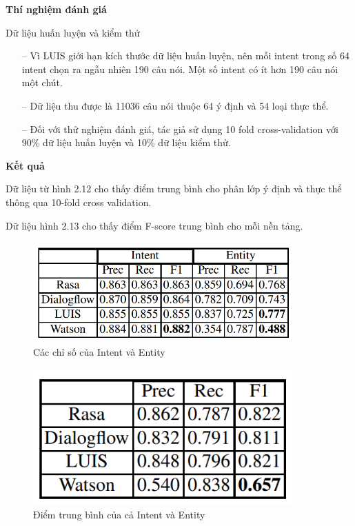 \textbf{Thí nghiệm đánh giá}

Dữ liệu huấn luyện và kiểm thử
\begin{itemize}
    \item[--] Vì LUIS giới hạn kích thước dữ liệu huấn luyện, nên mỗi intent trong số 64 intent chọn ra ngẫu nhiên 190 câu nói. Một số intent có ít hơn 190 câu nói một chút.
    \item[--] Dữ liệu thu được là 11036 câu nói thuộc 64 ý định và 54 loại thực thể.
    \item[--] Đối với thử nghiệm đánh giá, tác giả sử dụng 10 fold cross-validation với 90\% dữ liệu huấn luyện và 10\% dữ liệu kiểm thử.
\end{itemize}

\textbf{Kết quả}

Dữ liệu từ hình 2.12 cho thấy điểm trung bình cho phân lớp ý định và thực thể thông qua 10-fold cross validation.

Dữ liệu hình 2.13 cho thấy điểm F-score trung bình cho mỗi nền tảng.

\begin{figure}[htp]
    \centering
    \includegraphics[width=10cm]{images/comparisonimg/overallScores4IntentandEntity.png}
    \caption{Các chỉ số của Intent và Entity}
    \label{fig:overallScores4IntentandEntity}
\end{figure}

\begin{figure}[htp]
    \centering
    \includegraphics[width=10cm]{images/comparisonimg/combinedOverallScores.png}
    \caption{Điểm trung bình của cả Intent và Entity}
    \label{fig:combinedOverallScores}
\end{figure}

